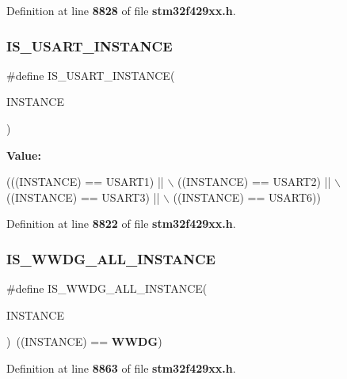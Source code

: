Definition at line \textbf{ 8828} of file \textbf{ stm32f429xx.\+h}.

\mbox{\label{group__Exported__macros_gafbce654f84a7c994817453695ac91cbe}} 
\subsubsection{I\+S\+\_\+\+U\+S\+A\+R\+T\+\_\+\+I\+N\+S\+T\+A\+N\+CE}
{\footnotesize\ttfamily \#define I\+S\+\_\+\+U\+S\+A\+R\+T\+\_\+\+I\+N\+S\+T\+A\+N\+CE(\begin{DoxyParamCaption}\item[{}]{I\+N\+S\+T\+A\+N\+CE }\end{DoxyParamCaption})}

{\bfseries Value\+:}
\begin{DoxyCode}
(((INSTANCE) == USART1) || \(\backslash\)
                                     ((INSTANCE) == USART2) || \(\backslash\)
                                     ((INSTANCE) == USART3) || \(\backslash\)
                                     ((INSTANCE) == USART6))
\end{DoxyCode}


Definition at line \textbf{ 8822} of file \textbf{ stm32f429xx.\+h}.

\mbox{\label{group__Exported__macros_gac2a8aaec233e19987232455643a04d6f}} 
\subsubsection{I\+S\+\_\+\+W\+W\+D\+G\+\_\+\+A\+L\+L\+\_\+\+I\+N\+S\+T\+A\+N\+CE}
{\footnotesize\ttfamily \#define I\+S\+\_\+\+W\+W\+D\+G\+\_\+\+A\+L\+L\+\_\+\+I\+N\+S\+T\+A\+N\+CE(\begin{DoxyParamCaption}\item[{}]{I\+N\+S\+T\+A\+N\+CE }\end{DoxyParamCaption})~((I\+N\+S\+T\+A\+N\+CE) == \textbf{ W\+W\+DG})}



Definition at line \textbf{ 8863} of file \textbf{ stm32f429xx.\+h}.

